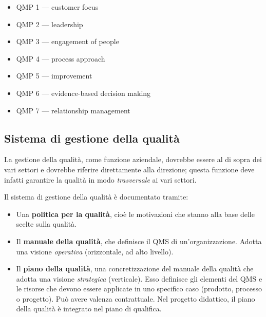 \documentclass[a4paper]{article}
\begin{document}
	\begin{itemize}
		
			
	\item QMP 1 --- customer focus
			
	\item QMP 2 --- leadership
			
	\item QMP 3 --- engagement of people
			
	\item QMP 4 --- process approach
			
	\item QMP 5 --- improvement
			
	\item QMP 6 --- evidence-based decision making
			
	\item QMP 7 --- relationship management
		
	\end{itemize}


		
	\subsection{Sistema di gestione della qualità}

		
La gestione della qualità, come funzione aziendale, dovrebbe essere al di sopra dei vari settori e dovrebbe riferire direttamente alla direzione; questa funzione deve infatti garantire la qualità in modo \emph{trasversale} ai vari settori.
		
Il sistema di gestione della qualità è documentato tramite:
		
	\begin{itemize}
		
			
	\item Una \textbf{politica per la qualità}, cioè le motivazioni che stanno alla base delle scelte sulla qualità.
			
	\item Il \textbf{manuale della qualità}, che definisce il QMS di un'organizzazione. Adotta una visione \emph{operativa} (orizzontale, ad alto livello).
			
	\item Il \textbf{piano della qualità}, una concretizzazione del manuale della qualità che adotta una visione \emph{strategica} (verticale). Esso definisce gli elementi del QMS e le risorse che devono essere applicate in uno specifico caso (prodotto, processo o progetto). Può avere valenza contrattuale. Nel progetto didattico, il piano della qualità è integrato nel piano di qualifica.
		
	\end{itemize}
\end{document}
